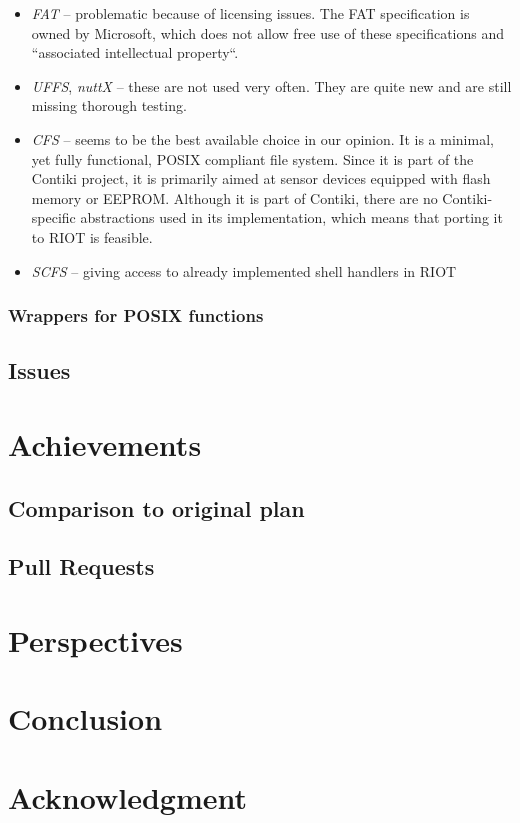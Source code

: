 \documentclass[conference]{IEEEtran}
\begin{document}
\begin{itemize}
  \item \emph{FAT}\cite{fat} -- problematic because of licensing issues. The FAT
    specification is owned by Microsoft, which does not allow free use
    of these specifications and ``associated intellectual
    property``\cite{fatlicense}.
  \item \emph{UFFS}\cite{uffs}, \emph{nuttX}\cite{nuttx} -- these are
    not used very often. They are quite new and are still missing
    thorough testing.
  \item \emph{CFS}\cite{cfs} -- seems to be the best available choice in
    our opinion. It is a minimal, yet fully functional, POSIX compliant
    file system. Since it is part of the Contiki project\cite{contiki},
    it is primarily aimed at sensor devices equipped with flash memory
    or EEPROM. Although it is part of Contiki, there are no
    Contiki-specific abstractions used in its implementation, which
    means that porting it to RIOT is feasible.
  \item \emph{SCFS} --  giving access to already
    implemented shell handlers in RIOT
\end{itemize}

\subsubsection{Wrappers for POSIX functions}
\label{ssub:Wrappers for POSIX functions}

\subsection{Issues}
\label{sub:Issues}

\section{Achievements}
\label{sec:Achievements}

\subsection{Comparison to original plan}
\label{sub:Comparison to original plan}

\subsection{Pull Requests}
\label{sub:Pull Requests}

\section{Perspectives}
\label{sec:Perspectives}

\section{Conclusion}
\label{sec:Conclusion}

\section*{Acknowledgment}
\label{sec:Acknowledgement}



\end{document}
